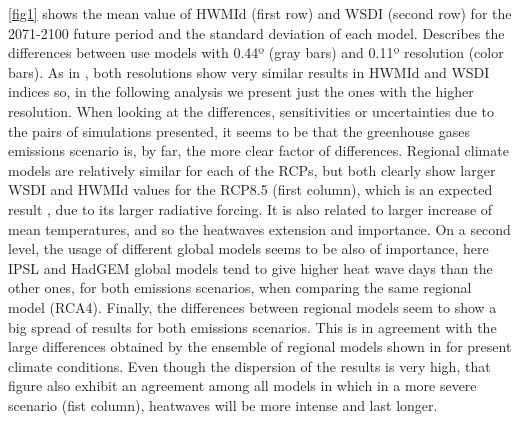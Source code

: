 \ref{fig1} shows the mean value of HWMId (first row) and WSDI (second row) for the
2071-2100 future period and the standard deviation of each model. Describes the
differences between use models with 0.44º (gray bars) and 0.11º resolution (color
bars). As in \cite{Pla_Kys2019}, both resolutions show very similar results in HWMId 
and WSDI indices so, in the following analysis we present just the ones with the
higher resolution. When looking at the differences, sensitivities or uncertainties due
to the pairs of simulations presented, it seems to be that the greenhouse gases
emissions
scenario is, by far, the more clear factor of differences. Regional climate
models are relatively similar for each of the RCPs, but both clearly show larger
WSDI and HWMId values for the RCP8.5 (first column), which is an expected result \cite{lho_al2018}, due to its larger
radiative forcing. It is also related to larger increase of mean temperatures, and
so the heatwaves extension and importance. On a second level, the usage
of different global models seems to be also of importance, here IPSL and HadGEM global models
tend to give higher heat wave days than the other ones, for both emissions
scenarios, when comparing the same regional model (RCA4). Finally, the differences
between regional models seem to show a big spread of results for both
emissions scenarios. This is in agreement with the large differences obtained by the
ensemble of regional models shown in \cite{vau_al2013} for present climate
conditions.
Even though the dispersion of the results is very high, that figure also exhibit an
agreement among all models in which in a more severe scenario (fist column), heatwaves
will be more intense \cite{ouz_al2016} and last longer. 

